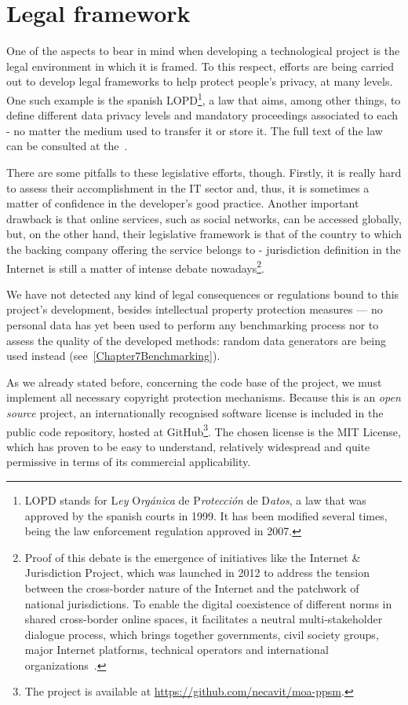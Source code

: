 \section{Legal framework}
\label{Practical::Legal}

One of the aspects to bear in mind when developing a technological project is the legal environment in which it is framed. To this respect, efforts are being carried out to develop legal frameworks to help protect people’s privacy, at many levels. One such example is the spanish LOPD\footnote{LOPD stands for L\textit{ey} O\textit{rgánica} de P\textit{rotección} de D\textit{atos}, a law that was approved by the spanish courts in 1999. It has been modified several times, being the law enforcement regulation approved in 2007.}, a law that aims, among other things, to define different data privacy levels and mandatory proceedings associated to each - no matter the medium used to transfer it or store it. The full text of the law can be consulted at the~\citet{BOE:LOPD}.

There are some pitfalls to these legislative efforts, though. Firstly, it is really hard to assess their accomplishment in the IT sector and, thus, it is sometimes a matter of confidence in the developer’s good practice. Another important drawback is that online services, such as social networks, can be accessed globally, but, on the other hand, their legislative framework is that of the country to which the backing company offering the service belongs to - jurisdiction definition in the Internet is still a matter of intense debate nowadays\footnote{Proof of this debate is the emergence of initiatives like the Internet \& Jurisdiction Project, which was launched in 2012 to address the tension between the cross-border nature of the Internet and the patchwork of national jurisdictions. To enable the digital coexistence of different norms in shared cross-border online spaces, it facilitates a neutral multi-stakeholder dialogue process, which brings together governments, civil society groups, major Internet platforms, technical operators and international organizations~\citep{web:InternetJurisdiction}.}.

We have not detected any kind of legal consequences or regulations bound to this project's development, besides intellectual property protection measures --- no personal data has yet been used to perform any benchmarking process nor to assess the quality of the developed methods: random data generators are being used instead (see~\cref{Chapter7Benchmarking}).

As we already stated before, concerning the code base of the project, we must implement all necessary copyright protection mechanisms. Because this is an \textit{open source} project, an internationally recognised software license is included in the public code repository, hosted at GitHub\footnote{The project is available at \url{https://github.com/necavit/moa-ppsm}.}. The chosen license is the MIT License, which has proven to be easy to understand, relatively widespread and quite permissive in terms of its commercial applicability.